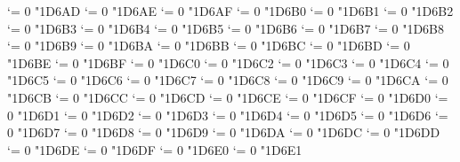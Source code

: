 {  \Umathcode `\Ζ = 0 \alphafam "1D6AD
  \Umathcode `\Η = 0 \alphafam "1D6AE
  \Umathcode `\Θ = 0 \alphafam "1D6AF
  \Umathcode `\Ι = 0 \alphafam "1D6B0
  \Umathcode `\Κ = 0 \alphafam "1D6B1
  \Umathcode `\Λ = 0 \alphafam "1D6B2
  \Umathcode `\Μ = 0 \alphafam "1D6B3
  \Umathcode `\Ν = 0 \alphafam "1D6B4
  \Umathcode `\Ξ = 0 \alphafam "1D6B5
  \Umathcode `\Ο = 0 \alphafam "1D6B6
  \Umathcode `\Π = 0 \alphafam "1D6B7
  \Umathcode `\Ρ = 0 \alphafam "1D6B8
  \Umathcode `\ϴ = 0 \alphafam "1D6B9
  \Umathcode `\Σ = 0 \alphafam "1D6BA
  \Umathcode `\Τ = 0 \alphafam "1D6BB
  \Umathcode `\Υ = 0 \alphafam "1D6BC
  \Umathcode `\Φ = 0 \alphafam "1D6BD
  \Umathcode `\Χ = 0 \alphafam "1D6BE
  \Umathcode `\Ψ = 0 \alphafam "1D6BF
  \Umathcode `\Ω = 0 \alphafam "1D6C0
  \Umathcode `\α = 0 \alphafam "1D6C2
  \Umathcode `\β = 0 \alphafam "1D6C3
  \Umathcode `\γ = 0 \alphafam "1D6C4
  \Umathcode `\δ = 0 \alphafam "1D6C5
  \Umathcode `\ε = 0 \alphafam "1D6C6
  \Umathcode `\ζ = 0 \alphafam "1D6C7
  \Umathcode `\η = 0 \alphafam "1D6C8
  \Umathcode `\θ = 0 \alphafam "1D6C9
  \Umathcode `\ι = 0 \alphafam "1D6CA
  \Umathcode `\κ = 0 \alphafam "1D6CB
  \Umathcode `\λ = 0 \alphafam "1D6CC
  \Umathcode `\μ = 0 \alphafam "1D6CD
  \Umathcode `\ν = 0 \alphafam "1D6CE
  \Umathcode `\ξ = 0 \alphafam "1D6CF
  \Umathcode `\ο = 0 \alphafam "1D6D0
  \Umathcode `\π = 0 \alphafam "1D6D1
  \Umathcode `\ρ = 0 \alphafam "1D6D2
  \Umathcode `\ς = 0 \alphafam "1D6D3
  \Umathcode `\σ = 0 \alphafam "1D6D4
  \Umathcode `\τ = 0 \alphafam "1D6D5
  \Umathcode `\υ = 0 \alphafam "1D6D6
  \Umathcode `\ϕ = 0 \alphafam "1D6D7
  \Umathcode `\χ = 0 \alphafam "1D6D8
  \Umathcode `\ψ = 0 \alphafam "1D6D9
  \Umathcode `\ω = 0 \alphafam "1D6DA
  \Umathcode `\ϵ = 0 \alphafam "1D6DC
  \Umathcode `\ϑ = 0 \alphafam "1D6DD
  \Umathcode `\ϰ = 0 \alphafam "1D6DE
  \Umathcode `\φ = 0 \alphafam "1D6DF
  \Umathcode `\ϱ = 0 \alphafam "1D6E0
  \Umathcode `\ϖ = 0 \alphafam "1D6E1
\fi
\tenbf}

